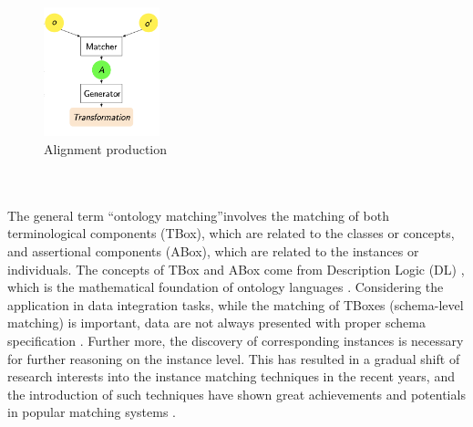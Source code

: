 \begin{figure}[ht]
\begin{center}
\includegraphics[width=0.3\textwidth]{img/ontomatch.png}
\caption{Alignment production}
\label{fig:align}
\end{center}
\end{figure}
\\\\
The general term \textquotedblleft ontology matching\textquotedblright \space involves the matching of both terminological components (TBox), which are related to the classes or concepts, and assertional components (ABox), which are related to the instances or individuals. The concepts of TBox and ABox come from Description Logic (DL) \cite{DBLP:books/daglib/0041477}, which is the mathematical foundation of ontology languages \cite{DBLP:journals/cacm/Horrocks08}. Considering the application in data integration tasks, while the matching of TBoxes (schema-level matching) is important, data are not always presented with proper schema specification \cite{DBLP:conf/boemie/CastanoFMV11}. Further more, the discovery of corresponding instances is necessary for further reasoning on the instance level. This has resulted in a gradual shift of research interests into the instance matching techniques in the recent years, and the introduction of such techniques have shown great achievements and potentials in popular matching systems \cite{DBLP:conf/scdm/AbubakarHMA18}.

